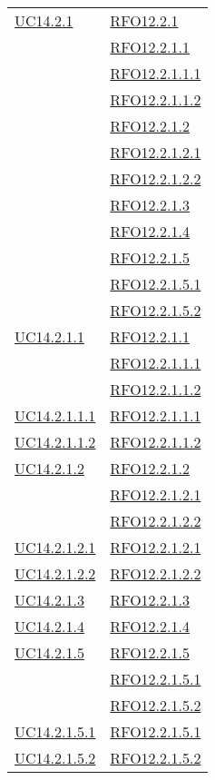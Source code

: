 \begin{longtable}{|>{\centering}m{5cm}|m{5cm}<{\centering}|}
\hyperlink{UC14.2.1}{UC14.2.1} 
& \hyperlink{RFO12.2.1}{RFO12.2.1}\\
& \hyperlink{RFO12.2.1.1}{RFO12.2.1.1}\\
& \hyperlink{RFO12.2.1.1.1}{RFO12.2.1.1.1}\\
& \hyperlink{RFO12.2.1.1.2}{RFO12.2.1.1.2}\\
& \hyperlink{RFO12.2.1.2}{RFO12.2.1.2}\\
& \hyperlink{RFO12.2.1.2.1}{RFO12.2.1.2.1}\\
& \hyperlink{RFO12.2.1.2.2}{RFO12.2.1.2.2}\\
& \hyperlink{RFO12.2.1.3}{RFO12.2.1.3}\\
& \hyperlink{RFO12.2.1.4}{RFO12.2.1.4}\\
& \hyperlink{RFO12.2.1.5}{RFO12.2.1.5}\\
& \hyperlink{RFO12.2.1.5.1}{RFO12.2.1.5.1}\\
& \hyperlink{RFO12.2.1.5.2}{RFO12.2.1.5.2}\\\hline

\hyperlink{UC14.2.1.1}{UC14.2.1.1} 
& \hyperlink{RFO12.2.1.1}{RFO12.2.1.1}\\
& \hyperlink{RFO12.2.1.1.1}{RFO12.2.1.1.1}\\
& \hyperlink{RFO12.2.1.1.2}{RFO12.2.1.1.2}\\\hline

\hyperlink{UC14.2.1.1.1}{UC14.2.1.1.1} & \hyperlink{RFO12.2.1.1.1}{RFO12.2.1.1.1}\\\hline
\hyperlink{UC14.2.1.1.2}{UC14.2.1.1.2} & \hyperlink{RFO12.2.1.1.2}{RFO12.2.1.1.2}\\\hline

\hyperlink{UC14.2.1.2}{UC14.2.1.2}
& \hyperlink{RFO12.2.1.2}{RFO12.2.1.2}\\
& \hyperlink{RFO12.2.1.2.1}{RFO12.2.1.2.1}\\
& \hyperlink{RFO12.2.1.2.2}{RFO12.2.1.2.2}\\\hline

\hyperlink{UC14.2.1.2.1}{UC14.2.1.2.1} & \hyperlink{RFO12.2.1.2.1}{RFO12.2.1.2.1}\\\hline
\hyperlink{UC14.2.1.2.2}{UC14.2.1.2.2} & \hyperlink{RFO12.2.1.2.2}{RFO12.2.1.2.2}\\\hline

\hyperlink{UC14.2.1.3}{UC14.2.1.3} & \hyperlink{RFO12.2.1.3}{RFO12.2.1.3}\\\hline
\hyperlink{UC14.2.1.4}{UC14.2.1.4} & \hyperlink{RFO12.2.1.4}{RFO12.2.1.4}\\\hline

\hyperlink{UC14.2.1.5}{UC14.2.1.5}
& \hyperlink{RFO12.2.1.5}{RFO12.2.1.5}\\
& \hyperlink{RFO12.2.1.5.1}{RFO12.2.1.5.1}\\
& \hyperlink{RFO12.2.1.5.2}{RFO12.2.1.5.2}\\\hline

\hyperlink{UC14.2.1.5.1}{UC14.2.1.5.1} & \hyperlink{RFO12.2.1.5.1}{RFO12.2.1.5.1}\\\hline
\hyperlink{UC14.2.1.5.2}{UC14.2.1.5.2} & \hyperlink{RFO12.2.1.5.2}{RFO12.2.1.5.2}\\\hline


\end{longtable}